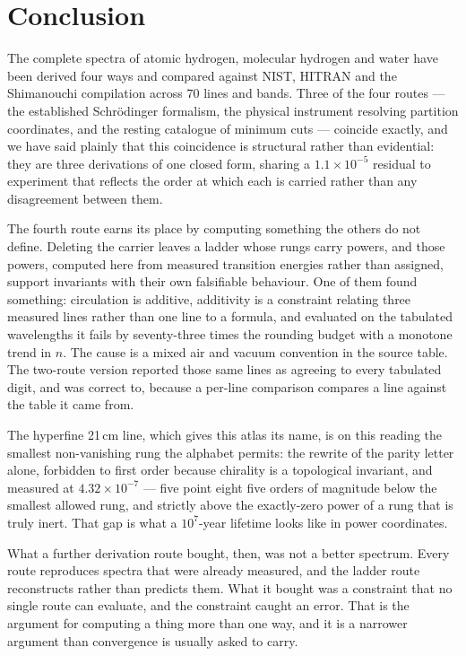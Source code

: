 \documentclass[11pt,a4paper]{article}
\theoremstyle{stmtstyle}
\theoremstyle{definition}
\theoremstyle{remark}
\begin{document}
\section{Conclusion}
\label{sec:conclusion}

The complete spectra of atomic hydrogen, molecular hydrogen and water have
been derived four ways and compared against NIST, HITRAN and the
Shimanouchi compilation across $70$ lines and bands. Three of the four
routes --- the established Schr\"odinger formalism, the physical instrument
resolving partition coordinates, and the resting catalogue of minimum cuts
--- coincide exactly, and we have said plainly that this coincidence is
structural rather than evidential: they are three derivations of one closed
form, sharing a $1.1\times10^{-5}$ residual to experiment that reflects the
order at which each is carried rather than any disagreement between them.

The fourth route earns its place by computing something the others do not
define. Deleting the carrier leaves a ladder whose rungs carry powers, and
those powers, computed here from measured transition energies rather than
assigned, support invariants with their own falsifiable behaviour. One of
them found something: circulation is additive, additivity is a constraint
relating three measured lines rather than one line to a formula, and
evaluated on the tabulated wavelengths it fails by seventy-three times the
rounding budget with a monotone trend in $n$. The cause is a mixed air and
vacuum convention in the source table. The two-route version reported those
same lines as agreeing to every tabulated digit, and was correct to, because
a per-line comparison compares a line against the table it came from.

The hyperfine 21\,cm line, which gives this atlas its name, is on this
reading the smallest non-vanishing rung the alphabet permits: the rewrite of
the parity letter alone, forbidden to first order because chirality is a
topological invariant, and measured at $4.32\times10^{-7}$ --- five point
eight five orders of magnitude below the smallest allowed rung, and
strictly above the exactly-zero power of a rung that is truly inert. That
gap is what a $10^{7}$-year lifetime looks like in power coordinates.

What a further derivation route bought, then, was not a better spectrum.
Every route reproduces spectra that were already measured, and the ladder
route reconstructs rather than predicts them. What it bought was a
constraint that no single route can evaluate, and the constraint caught an
error. That is the argument for computing a thing more than one way, and it
is a narrower argument than convergence is usually asked to carry.
\end{document}
